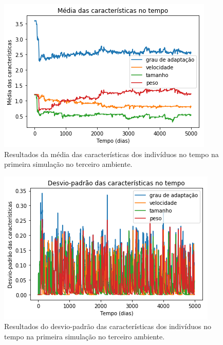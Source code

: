 \documentclass[10pt,brazil,english]{article}
\begin{document}
        \begin{figure}[!hbtp]
            \begin{center}
                \includegraphics[scale=0.5]{Images/3-1.png}
            \end{center}
            \caption{Resultados da média das características dos indivíduos no tempo na primeira simulação no terceiro ambiente.}
            \label{Fig13}
        \end{figure} 
        
        \begin{figure}[!hbtp]
            \begin{center}
                \includegraphics[scale=0.5]{Images/3-2.png}
            \end{center}
            \caption{Resultados do desvio-padrão das características dos indivíduos no tempo na primeira simulação no terceiro ambiente.}
            \label{Fig14}
        \end{figure} 
        
\end{document}
